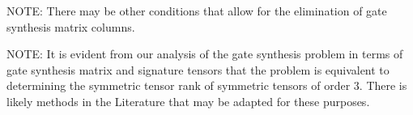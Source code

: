 \documentclass{article}
\theoremstyle{definition}
\theoremstyle{problem}
\theoremstyle{lemma}
\begin{document}
			NOTE: There may be other conditions that allow for the elimination of gate synthesis matrix columns.
			
			NOTE: It is evident from our analysis of the gate synthesis problem in terms of gate synthesis matrix and signature tensors that the problem is equivalent to determining the symmetric tensor rank of symmetric tensors of order 3. There is likely methods in the Literature that may be adapted for these purposes.
			
			
			
			
\end{document}
